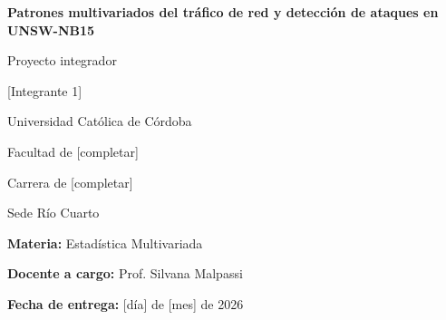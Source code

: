 \documentclass[11pt,a4paper]{article}
\newcommand{\titulo}{Patrones multivariados del tráfico de red y detección de ataques en UNSW-NB15}
\newcommand{\autores}{[Integrante 1]\par [Integrante 2]\par [Integrante 3]\par [Integrante 4]}
\newcommand{\afiliacion}{Universidad Católica de Córdoba\par Facultad de [completar]\par Carrera de [completar]\par Sede Río Cuarto}
\newcommand{\materia}{Estadística Multivariada}
\newcommand{\docente}{Prof. Silvana Malpassi}
\newcommand{\fechaentrega}{[día] de [mes] de 2026}
\begin{document}
\begingroup
  \thispagestyle{plain}
  \centering
  \vspace*{2.5cm}
  {\Large\bfseries \titulo \par}
  \vspace{1.2cm}
  {\large Proyecto integrador \par}
  \vspace{2cm}
  {\large \autores \par}
  \vspace{1.5cm}
  {\afiliacion \par}
  \vspace{1.5cm}
  {\textbf{Materia:} \materia \par}
  {\textbf{Docente a cargo:} \docente \par}
  \vspace{1.5cm}
  {\textbf{Fecha de entrega:} \fechaentrega \par}
  \vfill
\endgroup
\clearpage

\begin{singlespace}
\small
\tableofcontents
\vspace{0.3cm}
\listoffigures
\vspace{0.3cm}
\listoftables
\end{singlespace}
\clearpage

\label{inicio-cuerpo}








\label{fin-cuerpo}

\clearpage
{}
{}
\renewcommand{\refname}{Referencias bibliográficas}



\clearpage
\appendix
\renewcommand{\thesection}{\Alph{section}}

\end{document}
